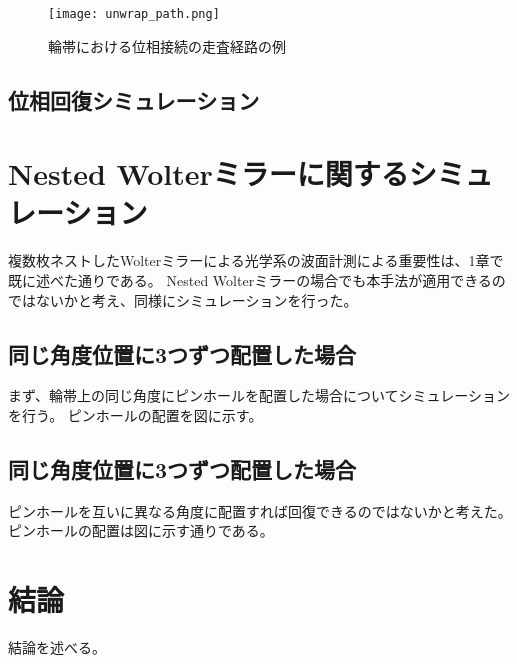 \begin{figure}[ht]
\centering
\texttt{[image: unwrap\_path.png]}
\caption{輪帯における位相接続の走査経路の例}
\label{fig:unwrap_path}
\end{figure}

\subsection{位相回復シミュレーション}
\label{chap3_transverse_simulation_result}

\clearpage
\newpage

\section{Nested Wolterミラーに関するシミュレーション}
\label{chap3_nested_transverse_simulation}

複数枚ネストしたWolterミラーによる光学系の波面計測による重要性は、1章で既に述べた通りである。
Nested Wolterミラーの場合でも本手法が適用できるのではないかと考え、同様にシミュレーションを行った。

\subsection{同じ角度位置に3つずつ配置した場合}
\label{chap3_nested_transverse_same_angle}

まず、輪帯上の同じ角度にピンホールを配置した場合についてシミュレーションを行う。
ピンホールの配置を図に示す。


\subsection{同じ角度位置に3つずつ配置した場合}
\label{chap3_nested_transverse_different_angle}

ピンホールを互いに異なる角度に配置すれば回復できるのではないかと考えた。
ピンホールの配置は図に示す通りである。


\clearpage
\newpage



\section{結論}
\label{chap3_conclusion}
結論を述べる。


